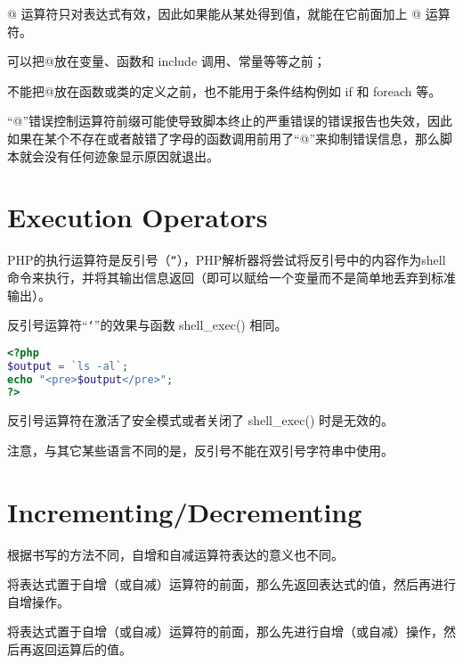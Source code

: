 @ 运算符只对表达式有效，因此如果能从某处得到值，就能在它前面加上 @ 运算符。

\begin{compactitem}
\item 可以把@放在变量、函数和 include 调用、常量等等之前；
\item 不能把@放在函数或类的定义之前，也不能用于条件结构例如 if 和 foreach 等。
\end{compactitem}


“@”错误控制运算符前缀可能使导致脚本终止的严重错误的错误报告也失效，因此如果在某个不存在或者敲错了字母的函数调用前用了“@”来抑制错误信息，那么脚本就会没有任何迹象显示原因就退出。



\section{Execution Operators}


PHP的执行运算符是反引号（\texttt{``}），PHP解析器将尝试将反引号中的内容作为shell命令来执行，并将其输出信息返回（即可以赋给一个变量而不是简单地丢弃到标准输出）。

反引号运算符“\texttt{`}”的效果与函数 shell\_exec() 相同。

\begin{lstlisting}[language=PHP]
<?php
$output = `ls -al`;
echo "<pre>$output</pre>";
?>
\end{lstlisting}

反引号运算符在激活了安全模式或者关闭了 shell\_exec() 时是无效的。

注意，与其它某些语言不同的是，反引号不能在双引号字符串中使用。


\section{Incrementing/Decrementing}

根据书写的方法不同，自增和自减运算符表达的意义也不同。

\begin{compactitem}
\item 将表达式置于自增（或自减）运算符的前面，那么先返回表达式的值，然后再进行自增操作。
\item 将表达式置于自增（或自减）运算符的前面，那么先进行自增（或自减）操作，然后再返回运算后的值。
\end{compactitem}

